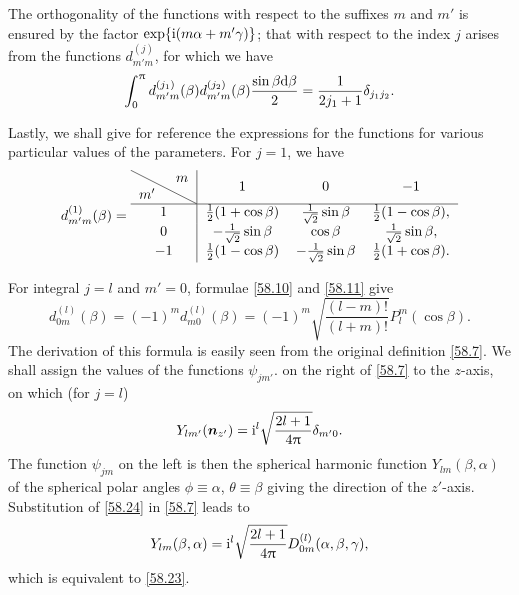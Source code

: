 The orthogonality of the functions with respect to the suffixes $ m $ and $ m' $ is ensured by the factor $ \exp\{\mathrm{i}(m\alpha+m'\gamma) \} $; that with respect to the index $ j $ arises from the functions $ d_{m'm}^{(j)} $, for which we have
\begin{equation}\label{58.21}
\int_{0}^{\uppi}d_{m'm}^{(j_1)}(\beta)d_{m'm}^{(j_2)}(\beta)\frac{\sin\beta\mathrm{d}\beta}{2}=\frac{1}{2j_1+1}\delta_{j_1j_2}.
\end{equation}


Lastly, we shall give for reference the expressions for the functions for various particular values of the parameters. For $ j = 1 $, we have
\begin{equation}\label{58.22}
d_{m'm}^{(1)}(\beta)=\begin{tabular}{c|ccc}
\diagbox{$ m' $}{$ m $} & $ 1 $ & $ 0 $ & $ -1 $\\
\hline
$ 1 $ & $ \frac{1}{2}(1+\cos\beta) $ & $ \frac{1}{\sqrt{2}}\sin\beta $ & $ \frac{1}{2}(1-\cos\beta), $\\
$ 0 $ &$ -\frac{1}{\sqrt{2}}\sin\beta $ & $ \cos\beta $ & $ \frac{1}{\sqrt{2}}\sin\beta, $\\
$ -1 $ & $ \frac{1}{2}(1-\cos\beta) $ & $ -\frac{1}{\sqrt{2}}\sin\beta $ & $ \frac{1}{2}(1+\cos\beta). $
\end{tabular}
\end{equation}

For integral $ j = l $ and $ m' = 0 $, formulae \eqref{58.10} and \eqref{58.11} give
\begin{equation}\label{58.23}
d_{0m}^{(l)}(\beta)=(-1)^md_{m0}^{(l)}(\beta)=(-1)^m\sqrt{\frac{(l-m)!}{(l+m)!}}P_l^m(\cos\beta).
\end{equation}
The derivation of this formula is easily seen from the original definition \eqref{58.7}. We shall assign the values of the functions $\psi_{jm'}$. on the right of \eqref{58.7} to the $ z $-axis, on which (for $ j = l $)
\begin{equation}\label{58.24}
Y_{lm'}(\bm{n}_{z'})=\mathrm{i}^l\sqrt{\frac{2l+1}{4\uppi}}\delta_{m'0}.
\end{equation}
 The function $\psi_{jm}$ on the left is then the spherical harmonic function $ Y_{lm}(\beta, \alpha) $ of the spherical polar angles $ \phi\equiv\alpha $, $ \theta\equiv\beta $ giving the direction of the $ z' $-axis. Substitution of \eqref{58.24} in \eqref{58.7} leads to
\begin{equation}\label{58.25}
Y_{lm}(\beta,\alpha)=\mathrm{i}^l\sqrt{\frac{2l+1}{4\uppi}}D_{0m}^{(l)}(\alpha,\beta,\gamma),
\end{equation}
which is equivalent to \eqref{58.23}.

